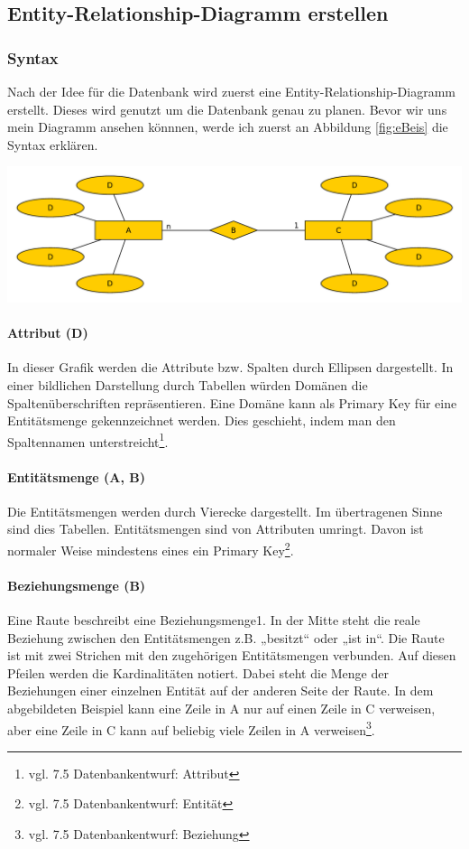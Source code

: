 \documentclass[a4paper, 12pt]{article}
\theoremstyle{plain}
\theoremstyle{definition}
\begin{document}
	\subsection{Entity-Relationship-Diagramm erstellen}
	\label{sec:ERDers}
	\subsubsection{Syntax}
	\label{sec:ERSyntax}
	Nach der Idee für die Datenbank wird zuerst eine Entity-Relationship-Diagramm erstellt. Dieses wird genutzt um die Datenbank genau zu planen. Bevor wir uns mein Diagramm ansehen könnnen, werde ich zuerst an Abbildung \ref{fig:eBeis} die Syntax erklären.
	\begin{center}
	\includegraphics[scale=0.6, ]{EntityBeis.pdf}
	\label{fig:eBeis}
	\end{center}
	
	\paragraph{Attribut (D)} In dieser Grafik werden die Attribute bzw. Spalten durch Ellipsen dargestellt. In einer bildlichen Darstellung durch Tabellen würden Domänen die Spaltenüberschriften repräsentieren. Eine Domäne kann als Primary Key für eine Entitätsmenge gekennzeichnet werden. Dies geschieht, indem man den Spaltennamen unterstreicht\footnote{vgl. \cite{Jarosch2010} 7.5 Datenbankentwurf: Attribut}.
	
	\paragraph{Entitätsmenge (A, B)} Die Entitätsmengen werden durch Vierecke dargestellt. Im übertragenen Sinne sind dies Tabellen. Entitätsmengen sind von Attributen umringt. Davon ist normaler Weise mindestens eines ein Primary Key\footnote{vgl. \cite{Jarosch2010} 7.5 Datenbankentwurf: Entität}.
	
	\paragraph{Beziehungsmenge (B)} Eine Raute beschreibt eine Beziehungsmenge1. In der Mitte steht die reale Beziehung zwischen den Entitätsmengen z.B. „besitzt“ oder „ist in“. Die Raute ist mit zwei Strichen mit den zugehörigen Entitätsmengen verbunden.  Auf diesen Pfeilen werden die Kardinalitäten notiert. Dabei steht die Menge der Beziehungen einer einzelnen Entität auf der anderen Seite der Raute. In dem abgebildeten Beispiel kann eine Zeile in A nur auf einen Zeile in C verweisen, aber eine Zeile in C kann auf beliebig viele Zeilen in A verweisen\footnote{vgl. \cite{Jarosch2010} 7.5 Datenbankentwurf: Beziehung}. 
\end{document}
